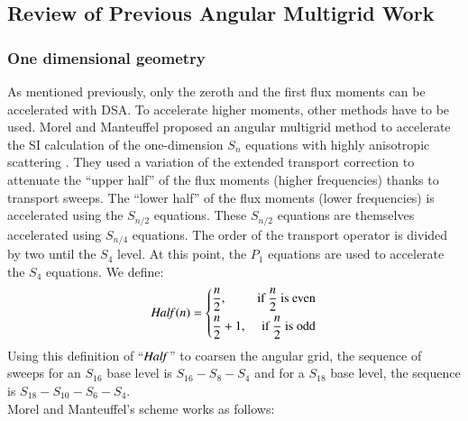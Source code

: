 \documentclass[preprint,10pt]{elsarticle}
\renewcommand{\(}{\left(}
\renewcommand{\)}{\right)}
\renewcommand{\[}{\left[}
\renewcommand{\]}{\right]}
\newcommand{\Half}{\text{\it Half\,}}
\begin{document}
\subsection{Review of Previous Angular Multigrid Work} 

\subsubsection{One dimensional geometry}

As mentioned previously, only the zeroth and the first flux moments can be
accelerated with DSA. To accelerate higher moments, other methods have to be
used. Morel and Manteuffel proposed an angular 
multigrid method to accelerate the SI calculation of the one-dimension 
$S_n$ equations with  highly anisotropic scattering 
\cite{multigrid_1d}. They used a variation of the extended
transport correction \cite{lathrop} to attenuate the ``upper half'' of the
flux moments (higher frequencies) thanks to transport sweeps. The ``lower half'' 
of the flux moments (lower frequencies) is accelerated using the $S_{n/2}$ 
equations. These $S_{n/2}$ equations are themselves 
accelerated using $S_{n/4}$ equations. The order of the transport operator is 
divided by two until the $S_4$ level. At this point, the $P_1$ equations are 
used to accelerate the $S_4$ equations. We define:
%
\begin{equation}
\Half(n) = \left\{
\begin{aligned}
&\frac{n}{2}, &\textrm{if $\frac{n}{2}$ is even}\\
&\frac{n}{2}+1, &\textrm{if $\frac{n}{2}$ is odd}
\end{aligned}
\right.
\end{equation}
%
Using this definition of ``$\Half$'' to coarsen the angular grid, the sequence
of sweeps for an $S_{16}$ base level is $S_{16}-S_8-S_4$ and for a $S_{18}$ base level, 
the sequence is $S_{18}-S_{10}-S_6-S_4$.\\
%
Morel and Manteuffel's scheme works as follows:
% 
\end{document}
